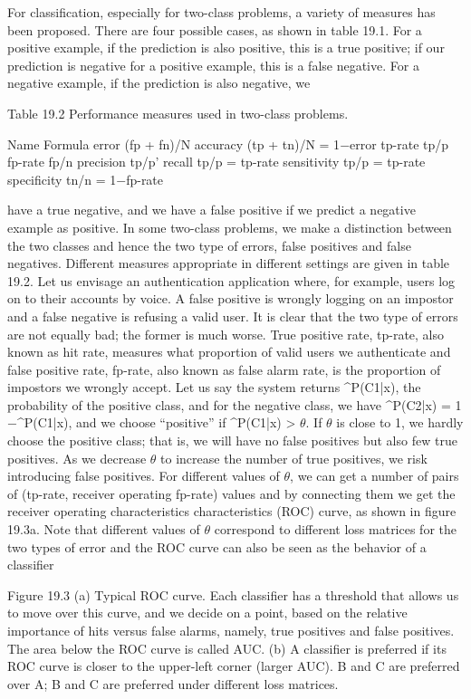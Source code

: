 For classification, especially for two-class problems, a variety of measures has been proposed. There are four possible cases, as shown in table 19.1. For a positive example, if the prediction is also positive, this is a true positive; if our prediction is negative for a positive example, this is a false negative. For a negative example, if the prediction is also negative, we

Table 19.2 Performance measures used in two-class problems.

Name Formula error (fp + fn)/N accuracy (tp + tn)/N = 1$-$error tp-rate tp/p fp-rate fp/n precision tp/p' recall tp/p = tp-rate sensitivity tp/p = tp-rate specificity tn/n = 1$-$fp-rate

have a true negative, and we have a false positive if we predict a negative example as positive. In some two-class problems, we make a distinction between the two classes and hence the two type of errors, false positives and false negatives. Different measures appropriate in different settings are given in table 19.2. Let us envisage an authentication application where, for example, users log on to their accounts by voice. A false positive is wrongly logging on an impostor and a false negative is refusing a valid user. It is clear that the two type of errors are not equally bad; the former is much worse. True positive rate, tp-rate, also known as hit rate, measures what proportion of valid users we authenticate and false positive rate, fp-rate, also known as false alarm rate, is the proportion of impostors we wrongly accept. Let us say the system returns \textasciicircum{}P(C1|x), the probability of the positive class, and for the negative class, we have \textasciicircum{}P(C2|x) = 1 $-$\textasciicircum{}P(C1|x), and we choose “positive” if \textasciicircum{}P(C1|x) > $\theta$. If $\theta$ is close to 1, we hardly choose the positive class; that is, we will have no false positives but also few true positives. As we decrease $\theta$ to increase the number of true positives, we risk introducing false positives. For different values of $\theta$, we can get a number of pairs of (tp-rate, receiver operating fp-rate) values and by connecting them we get the receiver operating characteristics characteristics (ROC) curve, as shown in figure 19.3a. Note that different values of $\theta$ correspond to different loss matrices for the two types of error and the ROC curve can also be seen as the behavior of a classifier

Figure 19.3 (a) Typical ROC curve. Each classifier has a threshold that allows us to move over this curve, and we decide on a point, based on the relative importance of hits versus false alarms, namely, true positives and false positives. The area below the ROC curve is called AUC. (b) A classifier is preferred if its ROC curve is closer to the upper-left corner (larger AUC). B and C are preferred over A; B and C are preferred under different loss matrices.

